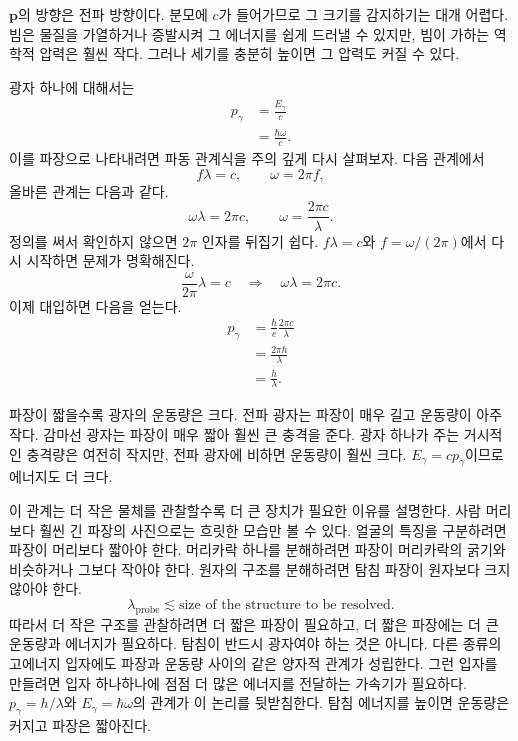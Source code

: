 \(\mathbf p\)의 방향은 전파 방향이다. 분모에 \(c\)가 들어가므로 그 크기를 감지하기는 대개 어렵다. 빔은 물질을 가열하거나 증발시켜 그 에너지를 쉽게 드러낼 수 있지만, 빔이 가하는 역학적 압력은 훨씬 작다. 그러나 세기를 충분히 높이면 그 압력도 커질 수 있다.

광자 하나에 대해서는
\begin{align}
p_\gamma
&=\frac{E_\gamma}{c}\\
&=\frac{\hbar\omega}{c}.
\end{align}
이를 파장으로 나타내려면 파동 관계식을 주의 깊게 다시 살펴보자. 다음 관계에서
\begin{equation}
f\lambda=c,
\qquad
\omega=2\pi f,
\end{equation}
올바른 관계는 다음과 같다.
\begin{equation}
\omega\lambda=2\pi c,
\qquad
\omega=\frac{2\pi c}{\lambda}.
\end{equation}
정의를 써서 확인하지 않으면 \(2\pi\) 인자를 뒤집기 쉽다. \(f\lambda=c\)와 \(f=\omega/(2\pi)\)에서 다시 시작하면 문제가 명확해진다.
\begin{equation}
\frac{\omega}{2\pi}\lambda=c
\quad\Longrightarrow\quad
\omega\lambda=2\pi c.
\end{equation}
이제 대입하면 다음을 얻는다.
\begin{align}
p_\gamma
&=\frac{\hbar}{c}\frac{2\pi c}{\lambda}\\
&=\frac{2\pi\hbar}{\lambda}\\
&=\frac{h}{\lambda}.
\end{align}

\begin{classroomqa}
\end{classroomqa}

파장이 짧을수록 광자의 운동량은 크다. 전파 광자는 파장이 매우 길고 운동량이 아주 작다. 감마선 광자는 파장이 매우 짧아 훨씬 큰 충격을 준다. 광자 하나가 주는 거시적인 충격량은 여전히 작지만, 전파 광자에 비하면 운동량이 훨씬 크다. \(E_\gamma=cp_\gamma\)이므로 에너지도 더 크다.

이 관계는 더 작은 물체를 관찰할수록 더 큰 장치가 필요한 이유를 설명한다. 사람 머리보다 훨씬 긴 파장의 사진으로는 흐릿한 모습만 볼 수 있다. 얼굴의 특징을 구분하려면 파장이 머리보다 짧아야 한다. 머리카락 하나를 분해하려면 파장이 머리카락의 굵기와 비슷하거나 그보다 작아야 한다. 원자의 구조를 분해하려면 탐침 파장이 원자보다 크지 않아야 한다.
\begin{equation}
\lambda_{\mathrm{probe}}\lesssim
\text{size of the structure to be resolved}.
\end{equation}
따라서 더 작은 구조를 관찰하려면 더 짧은 파장이 필요하고, 더 짧은 파장에는 더 큰 운동량과 에너지가 필요하다. 탐침이 반드시 광자여야 하는 것은 아니다. 다른 종류의 고에너지 입자에도 파장과 운동량 사이의 같은 양자적 관계가 성립한다. 그런 입자를 만들려면 입자 하나하나에 점점 더 많은 에너지를 전달하는 가속기가 필요하다. \(p_\gamma=h/\lambda\)와 \(E_\gamma=\hbar\omega\)의 관계가 이 논리를 뒷받침한다. 탐침 에너지를 높이면 운동량은 커지고 파장은 짧아진다.


